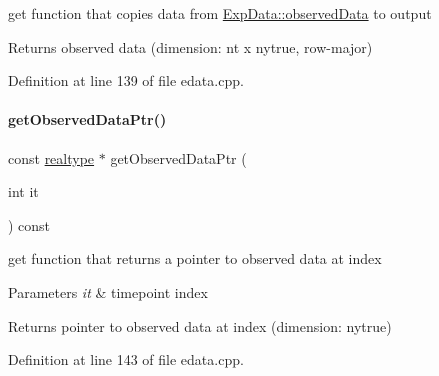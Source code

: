get function that copies data from \mbox{\hyperlink{classamici_1_1_exp_data_a6acedf749a3c5e4c4dcbc822f58a565d}{Exp\+Data\+::observed\+Data}} to output

\begin{DoxyReturn}{Returns}
observed data (dimension\+: nt x nytrue, row-\/major) 
\end{DoxyReturn}


Definition at line 139 of file edata.\+cpp.

\mbox{\label{classamici_1_1_exp_data_a8839910b831f8c55976d880df081fb3e}} 
\paragraph{\texorpdfstring{get\+Observed\+Data\+Ptr()}{getObservedDataPtr()}}
{\footnotesize\ttfamily const \mbox{\hyperlink{namespaceamici_a1bdce28051d6a53868f7ccbf5f2c14a3}{realtype}} $\ast$ get\+Observed\+Data\+Ptr (\begin{DoxyParamCaption}\item[{int}]{it }\end{DoxyParamCaption}) const}

get function that returns a pointer to observed data at index


\begin{DoxyParams}{Parameters}
{\em it} & timepoint index \\
\hline
\end{DoxyParams}
\begin{DoxyReturn}{Returns}
pointer to observed data at index (dimension\+: nytrue) 
\end{DoxyReturn}


Definition at line 143 of file edata.\+cpp.

